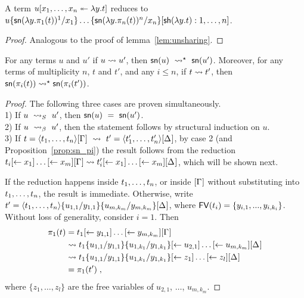 \documentclass{llncs} %
\begin{document}
\begin{lemma}
\label{lem:undist}
A term $u\distr xyt$ reduces to 
\\ $u\sub{x_1}{\sn(\lambda y.\pi_1(t))^1}\dots\sub{x_n}{\sn(\lambda y.\pi_n(t))^n}[\sh (\lambda y.t):1,\dots,n]$.
\end{lemma}


\begin{proof}
Analogous to the proof of lemma~\ref{lem:unsharing}.
\end{proof}


\begin{lemma}
\label{lem:lift-sn}
For any terms $u$ and $u'$ if $u\rewrite u'$, then $\sn(u)
~\rewrite^\star~ \sn(u')$. Moreover, for any terms of multiplicity
$n$, $t$ and $t'$, and any $i\leq n$, if $t\rewrite t'$, then
$\sn(\pi_i(t))\rewrite^\star\sn(\pi_i(t'))$.
\end{lemma}

\begin{proof}
The following three cases are proven simultaneously.
\\ 1) If $u ~\ALnotbeta~ u'$, then $\sn(u) ~=~ \sn(u')$.
\\ 2) If $u ~\ALbeta~ u'$, then the statement follows by structural induction on $u$.
\\ 3) If $t=\tup t\G ~\rewrite~ t'=\tup{t'}\G*$, by case 2 (and Proposition~\ref{prop:sn_pi}) the result follows from the reduction
%
	$t_i\share*{}{x_1}\dots\share*{}{x_m}\G\rewrite
	 t'_i\share*{}{x_1}\dots\share*{}{x_m}\G*$,
which will be shown next.

If the reduction happens inside $\vv t$, or inside $\G$ without substituting into
$\vv t$, the result is immediate.
%
Otherwise, write $t'=\tup t\sub{y_{1,1}}{u_{1,1}}\sub{y_{m,k_m}}{u_{m,k_m}}\G*$, where $\FV(t_i)=\{y_{i,1},...,y_{i,k_i}\}$.
%
Without loss of generality, consider $i=1$. Then
%
\[
\begin{aligned}
\pi_1(t)
	&= t_1\share*{}{y_{1,1}}\dots\share*{}{y_{m,k_m}}\G
\\ &\rewrite t_1\sub{y_{1,1}}{u_{1,1}}\sub{y_{1,k_1}}{u_{1,k_1}}\share*{}{u_{2,1}}\dots\share*{}{u_{m,k_m}}\G*
\\ &\rewrite t_1\sub{y_{1,1}}{u_{1,1}}\sub{y_{1,k_1}}{u_{1,k_1}}\share*{}{z_1}\dots\share*{}{z_l}\G*
\\ &= \pi_1(t')\;,
\end{aligned}
\]
%
where $\{z_1, \dots, z_l\}$ are the free variables of $u_{2,1}$,
$\dots$, $u_{m,k_m}$.

\end{proof}
\end{document}
